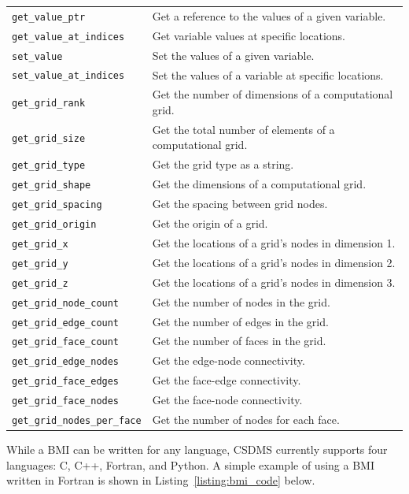 \documentclass[12pt]{amsart}
\begin{document}
\begin{table}[htbp]
\begin{tabular}{ll}
        \verb|get_value_ptr| & Get a reference to the values of a given variable. \\
        \verb|get_value_at_indices| & Get variable values at specific locations. \\
        \verb|set_value| & Set the values of a given variable. \\
        \verb|set_value_at_indices| & Set the values of a variable at specific locations. \\
        \verb|get_grid_rank| & Get the number of dimensions of a computational grid. \\
        \verb|get_grid_size| & Get the total number of elements of a computational grid. \\
        \verb|get_grid_type| & Get the grid type as a string. \\
        \verb|get_grid_shape| & Get the dimensions of a computational grid. \\
        \verb|get_grid_spacing| & Get the spacing between grid nodes. \\
        \verb|get_grid_origin| & Get the origin of a grid. \\
        \verb|get_grid_x| & Get the locations of a grid’s nodes in dimension 1. \\
        \verb|get_grid_y| & Get the locations of a grid’s nodes in dimension 2. \\
        \verb|get_grid_z| & Get the locations of a grid’s nodes in dimension 3. \\
        \verb|get_grid_node_count| & Get the number of nodes in the grid. \\
        \verb|get_grid_edge_count| & Get the number of edges in the grid. \\
        \verb|get_grid_face_count| & Get the number of faces in the grid. \\
        \verb|get_grid_edge_nodes| & Get the edge-node connectivity. \\
        \verb|get_grid_face_edges| & Get the face-edge connectivity. \\
        \verb|get_grid_face_nodes| & Get the face-node connectivity. \\
        \verb|get_grid_nodes_per_face| & Get the number of nodes for each face. \\
        
   \end{tabular}
   \label{tab:bmi}
\end{table}

While a BMI can be written for any language,
CSDMS currently supports four languages: C, C++, Fortran, and Python.
A simple example of using a BMI written in Fortran
is shown in Listing~\ref{listing:bmi_code} below.
\end{document}
